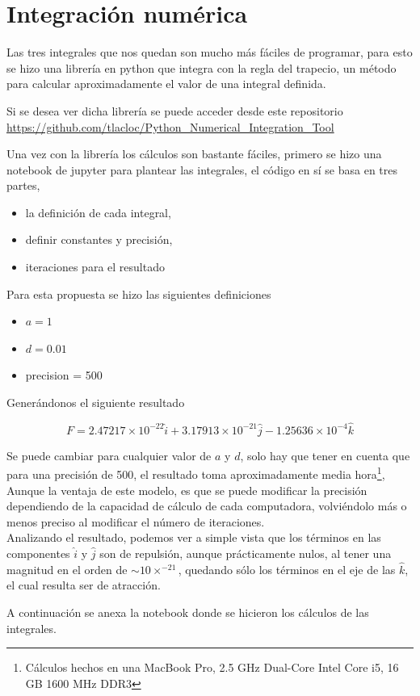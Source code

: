 \documentclass[11pt]{report}
\theoremstyle{plain}
\theoremstyle{definition}
\begin{document}
	\section*{Integración numérica}
	
	Las tres integrales que nos quedan son mucho más fáciles de programar, para esto se hizo una librería en python que integra con la regla del trapecio, un método para calcular aproximadamente el valor de una integral definida.
	
	Si se desea ver dicha librería se puede acceder desde este repositorio \url{https://github.com/tlacloc/Python_Numerical_Integration_Tool}
	
	Una vez con la librería los cálculos son bastante fáciles, primero se hizo una notebook de jupyter para plantear las integrales, el código en sí se basa en tres partes, 
	\begin{itemize}
		\item la definición de cada integral,
		\item definir constantes y precisión,
		\item iteraciones para el resultado
	\end{itemize}  

	
	Para esta propuesta se hizo las siguientes definiciones
	\begin{itemize}
		\item $a = 1$
		\item $d = 0.01$
		\item precision = 500
	\end{itemize}
	
	
	Generándonos el siguiente resultado
	
	\begin{equation*}
		F = 2.47217\times 10^{-22}\hat{i} + 3.17913\times 10^{-21}\hat{j} - 1.25636\times 10^{-4}\hat{k}
	\end{equation*}
	
	
	Se puede cambiar para cualquier valor de $a$ y $d$, solo hay que tener en cuenta que para una precisión de 500, el resultado toma aproximadamente media hora\footnote{Cálculos hechos en una MacBook Pro, 2.5 GHz Dual-Core Intel Core i5, 16 GB 1600 MHz DDR3}, Aunque la ventaja de este modelo, es que se puede modificar la precisión dependiendo de la capacidad de cálculo de cada computadora, volviéndolo más o menos preciso al modificar el número de iteraciones.\\
	
	Analizando el resultado, podemos ver a simple vista que los términos en las componentes $\hat{i}$ y $\hat{j}$ son de repulsión, aunque prácticamente nulos, al tener una magnitud en el orden de $\sim 10\times^{-21}$, quedando sólo los términos en el eje de las $\hat{k}$, el cual resulta ser de atracción.
	
	A continuación se anexa la notebook donde se hicieron los cálculos de las integrales.
	
	

\end{document}
